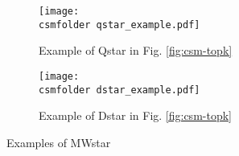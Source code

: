 \begin{figure}[t!]
    \def\wscorevone{0.49}
    \centering
        \begin{subfigure}[t]{\wscorevone\linewidth}
            \centering
            \resizebox{\linewidth}{!}
            {
                \texttt{[image: \\csmfolder qstar\_example.pdf]}
            }
            \caption{Example of Qstar in Fig. \ref{fig:csm-topk}}
            \label{fig:qstar}
        \end{subfigure}
        \begin{subfigure}[t]{\wscorevone\linewidth}
            \centering
            \resizebox{\linewidth}{!}
            {
                \texttt{[image: \\csmfolder dstar\_example.pdf]}
            }
            \caption{Example of Dstar in Fig. \ref{fig:csm-topk}}
            \label{fig:dstar}
        \end{subfigure}
        \caption{ Examples of MWstar}
        \label{fig:application}
    \end{figure}